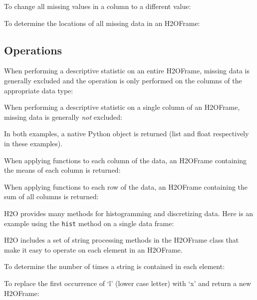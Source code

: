 {To change all missing values in a column to a different value:


\newpage
To determine the locations of all missing data in an H2OFrame:


\subsection{Operations}
When performing a descriptive statistic on an entire H2OFrame, missing data is generally excluded
and the operation is only performed on the columns of the appropriate data type:


When performing a descriptive statistic on a single column of an H2OFrame, missing data is generally 
\textit{not} excluded:


In both examples,  a native Python object is returned (list and float respectively
in these examples).

When applying functions to each column of the data, an H2OFrame containing the means of each column is returned:


When applying functions to each row of the data, an H2OFrame containing the sum of all columns is returned:


H2O provides many methods for histogramming and discretizing data.
Here is an example using the {\texttt{hist}} method on a single data frame:


H2O includes a set of string processing methods in the H2OFrame class
that make it easy to operate on each element in an H2OFrame.  

To determine the number of times a string is contained in each element:


To replace the first occurrence of `l' (lower case letter) with `x' and return a new H2OFrame:


}
